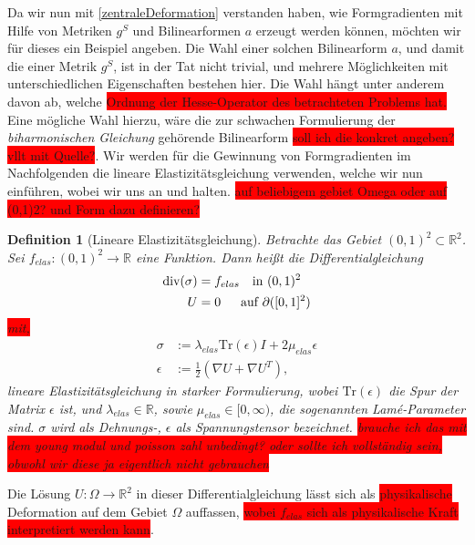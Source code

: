 \documentclass[bibliography=totoc,12pt,a4paper]{scrartcl}
\theoremstyle{exampstyle}
\newtheorem{defi}{Definition}%
\numberwithin{equation}{section}
\begin{document}
Da wir nun mit \ref{zentraleDeformation} verstanden haben, wie Formgradienten mit Hilfe von Metriken $g^S$ und Bilinearformen $a$ erzeugt werden können, möchten wir für dieses ein Beispiel angeben. Die Wahl einer solchen Bilinearform $a$, und damit die einer Metrik $g^S$, ist in der Tat nicht trivial, und mehrere Möglichkeiten mit unterschiedlichen Eigenschaften bestehen hier. Die Wahl hängt unter anderem davon ab, welche \colorbox{red}{Ordnung der Hesse-Operator des betrachteten Problems hat.} Eine mögliche Wahl hierzu, wäre die zur schwachen Formulierung der \textit{biharmonischen Gleichung} gehörende Bilinearform \colorbox{red}{soll ich die konkret angeben? vllt mit Quelle?}. Wir werden für die Gewinnung von Formgradienten im Nachfolgenden die lineare Elastizitätsgleichung verwenden, welche wir nun einführen, wobei wir uns an \cite{bfgs1} und \cite{bfgs2} halten. \colorbox{red}{auf beliebigem gebiet Omega oder auf (0,1)2? und Form dazu definieren?}

\begin{defi}[Lineare Elastizitätsgleichung]
	Betrachte das Gebiet $(0,1)^2 \subset \mathbb{R}^2$. Sei $f_{elas}: (0,1)^2 \rightarrow \mathbb{R}$ eine Funktion. Dann heißt die Differentialgleichung
	\begin{equation}\label{linelas}
		\begin{aligned}
		\text{div}(\sigma) &= f_{elas} \quad \text{in } (0,1)^2 \\
		U &= 0 \quad \hspace{0.2cm} \text{auf } \partial([0,1]^2)
		\end{aligned}
	\end{equation}	 
	\colorbox{red}{mit,}
	\begin{align*}
		\sigma &:= \lambda_{elas} \text{Tr}(\epsilon)I + 2\mu_{elas}\epsilon \\
		\epsilon &:= \frac{1}{2}(\nabla U + \nabla U^T),
	\end{align*}
	\textit{lineare Elastizitätsgleichung} in starker Formulierung, wobei $\text{Tr}(\epsilon)$ die Spur der Matrix $\epsilon$ ist, und $\lambda_{elas} \in \mathbb{R}$, sowie $\mu_{elas} \in [0,\infty)$, die sogenannten \textit{Lamé-Parameter} sind. $\sigma$ wird als Dehnungs-, $\epsilon$ als Spannungstensor bezeichnet. \colorbox{red}{brauche ich das mit dem young modul und poisson zahl unbedingt? oder sollte ich vollständig sein, obwohl wir diese ja eigentlich nicht gebrauchen}
\end{defi}

Die Lösung $U: \Omega \rightarrow \mathbb{R}^2$ in dieser Differentialgleichung lässt sich als \colorbox{red}{physikalische} Deformation auf dem Gebiet $\Omega$ auffassen, \colorbox{red}{wobei $f_{elas}$ sich als physikalische Kraft interpretiert werden kann}. 
\end{document}
